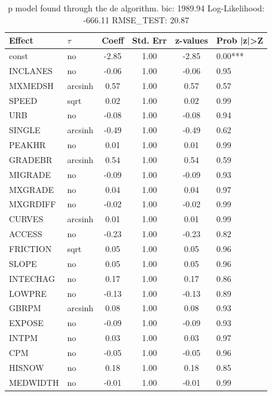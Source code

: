 \begin{table}
	\caption{p model found through the de algorithm. bic: 1989.94 Log-Likelihood: -666.11 RMSE_TEST: 20.87}
	\begin{center}
		\begin{tabular}{|l|l|c|c|c|l|}
			\hline
			Effect & $\tau$ & Coeff & Std. Err & z-values & Prob |z|>Z \\
			\hline
			const & no & -2.85 & 1.00 & -2.85 & 0.00*** \\
			\hline
			INCLANES & no & -0.06 & 1.00 & -0.06 & 0.95 \\
			\hline
			MXMEDSH & arcsinh & 0.57 & 1.00 & 0.57 & 0.57 \\
			\hline
			SPEED & sqrt & 0.02 & 1.00 & 0.02 & 0.99 \\
			\hline
			URB & no & -0.08 & 1.00 & -0.08 & 0.94 \\
			\hline
			SINGLE & arcsinh & -0.49 & 1.00 & -0.49 & 0.62 \\
			\hline
			PEAKHR & no & 0.01 & 1.00 & 0.01 & 0.99 \\
			\hline
			GRADEBR & arcsinh & 0.54 & 1.00 & 0.54 & 0.59 \\
			\hline
			MIGRADE & no & -0.09 & 1.00 & -0.09 & 0.93 \\
			\hline
			MXGRADE & no & 0.04 & 1.00 & 0.04 & 0.97 \\
			\hline
			MXGRDIFF & no & -0.02 & 1.00 & -0.02 & 0.99 \\
			\hline
			CURVES & arcsinh & 0.01 & 1.00 & 0.01 & 0.99 \\
			\hline
			ACCESS & no & -0.23 & 1.00 & -0.23 & 0.82 \\
			\hline
			FRICTION & sqrt & 0.05 & 1.00 & 0.05 & 0.96 \\
			\hline
			SLOPE & no & 0.05 & 1.00 & 0.05 & 0.96 \\
			\hline
			INTECHAG & no & 0.17 & 1.00 & 0.17 & 0.86 \\
			\hline
			LOWPRE & no & -0.13 & 1.00 & -0.13 & 0.89 \\
			\hline
			GBRPM & arcsinh & 0.08 & 1.00 & 0.08 & 0.93 \\
			\hline
			EXPOSE & no & -0.09 & 1.00 & -0.09 & 0.93 \\
			\hline
			INTPM & no & 0.03 & 1.00 & 0.03 & 0.97 \\
			\hline
			CPM & no & -0.05 & 1.00 & -0.05 & 0.96 \\
			\hline
			HISNOW & no & 0.18 & 1.00 & 0.18 & 0.85 \\
			\hline
			MEDWIDTH & no & -0.01 & 1.00 & -0.01 & 0.99 \\

\end{tabular}
\end{center}
\end{table}
